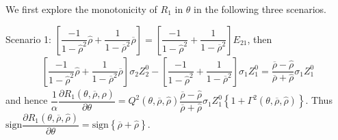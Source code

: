 \documentclass[10pt]{article}
\begin{document}
We first explore the monotonicity of {\footnotesize $ R_1 $} in {\footnotesize $ \theta $} in the following three scenarios.

Scenario 1: {\footnotesize $ \left[ \dfrac{- 1}{1 - {\hat \rho}^2} {\hat \rho} + \dfrac1{1 - \overline{\rho}^2} \overline{\rho} \right] = \left[ \dfrac{- 1}{1 - {\hat \rho}^2} + \dfrac1{1 - \overline{\rho}^2} \right] E_{2 1} $}, then
{\footnotesize \begin{eqnarray*}
\left[ \dfrac{- 1}{1 - {\hat \rho}^2} {\hat \rho} + \dfrac1{1 - \overline{\rho}^2} \overline{\rho} \right] \sigma_2 Z_2^0 - \left[ \dfrac{- 1}{1 - {\hat \rho}^2} + \dfrac1{1 - \overline{\rho}^2} \right] \sigma_1 Z_1^0 = \dfrac{\overline{\rho} - {\hat \rho}}{\overline{\rho} + {\hat \rho}} \sigma_1 Z_1^0
\end{eqnarray*}}
and hence {\footnotesize $ \dfrac{1}{\alpha} \dfrac{\partial R_1 (\theta, \overline{\rho}, {\hat \rho})}{\partial \theta} = Q^2 (\theta, \overline{\rho}, {\hat \rho}) \dfrac{\overline{\rho} - {\hat \rho}}{\overline{\rho} + {\hat \rho}} \sigma_1 Z_1^0 \left\{ 1 + \Gamma^2 (\theta, \overline{\rho}, {\hat \rho}) \right\} $}. Thus {\footnotesize $ \text{sign} \dfrac{\partial R_1 (\theta, \overline{\rho}, {\hat \rho})}{\partial \theta} = \text{sign} \left\{ \overline{\rho} + {\hat \rho} \right\} $}.
\end{document}
